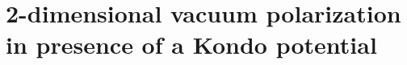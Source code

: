 \chapter{2-dimensional vacuum polarization in presence of a Kondo potential}\label{chap-vacuum}







